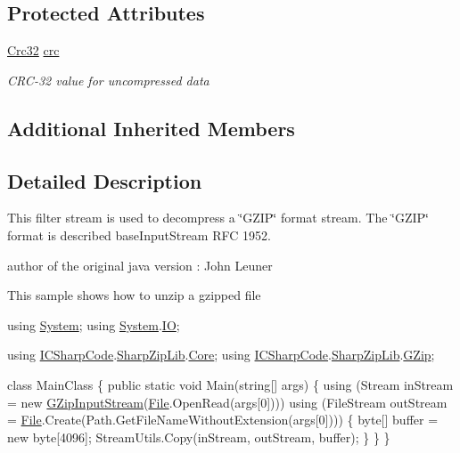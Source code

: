 \subsection*{Protected Attributes}
\begin{DoxyCompactItemize}
\item 
\hyperlink{class_i_c_sharp_code_1_1_sharp_zip_lib_1_1_checksums_1_1_crc32}{Crc32} \hyperlink{class_i_c_sharp_code_1_1_sharp_zip_lib_1_1_g_zip_1_1_g_zip_input_stream_a5547587a7fa539c60eaa8282ecf53f90}{crc}
\begin{DoxyCompactList}\small\item\em C\+R\+C-\/32 value for uncompressed data \end{DoxyCompactList}\end{DoxyCompactItemize}
\subsection*{Additional Inherited Members}


\subsection{Detailed Description}
This filter stream is used to decompress a \char`\"{}\+G\+Z\+I\+P\char`\"{} format stream. The \char`\"{}\+G\+Z\+I\+P\char`\"{} format is described base\+Input\+Stream R\+FC 1952. 

author of the original java version \+: John Leuner 

This sample shows how to unzip a gzipped file 
\begin{DoxyCode}
\textcolor{keyword}{using} \hyperlink{namespace_system}{System};
\textcolor{keyword}{using} \hyperlink{namespace_system}{System}.\hyperlink{namespace_system_1_1_i_o}{IO};

\textcolor{keyword}{using} \hyperlink{namespace_i_c_sharp_code}{ICSharpCode}.\hyperlink{namespace_i_c_sharp_code_1_1_sharp_zip_lib}{SharpZipLib}.\hyperlink{namespace_i_c_sharp_code_1_1_sharp_zip_lib_1_1_core}{Core};
\textcolor{keyword}{using} \hyperlink{namespace_i_c_sharp_code}{ICSharpCode}.\hyperlink{namespace_i_c_sharp_code_1_1_sharp_zip_lib}{SharpZipLib}.\hyperlink{namespace_i_c_sharp_code_1_1_sharp_zip_lib_1_1_g_zip}{GZip};

\textcolor{keyword}{class }MainClass
\{
    \textcolor{keyword}{public} \textcolor{keyword}{static} \textcolor{keywordtype}{void} Main(\textcolor{keywordtype}{string}[] args)
    \{
        \textcolor{keyword}{using} (Stream inStream = \textcolor{keyword}{new} \hyperlink{class_i_c_sharp_code_1_1_sharp_zip_lib_1_1_g_zip_1_1_g_zip_input_stream_a1b9e192df6366d0e8c5328037634393c}{GZipInputStream}(\hyperlink{namespace_lerp2_a_p_i_1_1_utility_af5d628470963cc0f18c37055b4170bf1a0b27918290ff5323bea1e3b78a9cf04e}{File}.OpenRead(args[0])))
        \textcolor{keyword}{using} (FileStream outStream = \hyperlink{namespace_lerp2_a_p_i_1_1_utility_af5d628470963cc0f18c37055b4170bf1a0b27918290ff5323bea1e3b78a9cf04e}{File}.Create(Path.GetFileNameWithoutExtension(args[0]))) \{
            byte[] buffer = \textcolor{keyword}{new} byte[4096];
            StreamUtils.Copy(inStream, outStream, buffer);
        \}
    \}
\}   
\end{DoxyCode}
 

